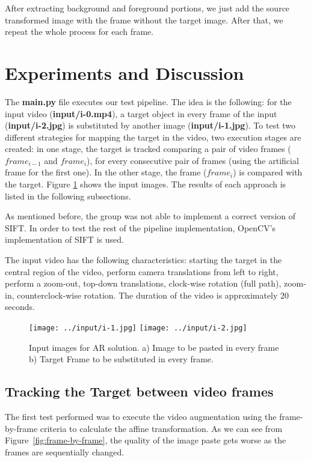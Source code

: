 \documentclass[]{IEEEtran}
\begin{document}
After extracting background and foreground portions, we just add the source transformed image with the frame without the target image. After that, we repeat the whole process for each frame.

\section{Experiments and Discussion}

The \textbf{main.py} file executes our test pipeline. The idea is the following: for the input video (\textbf{input/i-0.mp4}), a target object in every frame of the input (\textbf{{input/i-2.jpg}}) is substituted by another image (\textbf{input/i-1.jpg}). To test two different strategies for mapping the target in the video, two execution stages are created: in one stage, the target is tracked comparing a pair of video frames ($frame_{i - 1}$ and $frame_{i}$), for every consecutive pair of frames (using the artificial frame for the first one). In the other stage, the frame ($frame_{i}$) is compared with the target. Figure \ref{fig:target-and-image} shows the input images. The results of each approach is listed in the following subsections.

As mentioned before, the group was not able to implement a correct version of SIFT. In order to test the rest of the pipeline implementation, OpenCV's implementation of SIFT is used. 

The input video has the following characteristics: starting the target in the central region of the video, perform camera translations from left to right, perform a zoom-out, top-down translations, clock-wise rotation (full path), zoom-in, counterclock-wise rotation. The duration of the video is approximately 20 seconds.

\begin{figure}[H]
  \centering
  \texttt{[image: ../input/i-1.jpg]}
  \texttt{[image: ../input/i-2.jpg]}
  \caption{Input images for AR solution. a) Image to be pasted in every frame b) Target Frame to be substituted in every frame.}
  \label{fig:target-and-image}
\end{figure}

\subsection{Tracking the Target between video frames}

The first test performed was to execute the video augmentation using the frame-by-frame criteria to calculate the affine transformation. As we can see from Figure~\ref{fig:frame-by-frame}, the quality of the image paste gets worse as the frames are sequentially changed.
\end{document}
